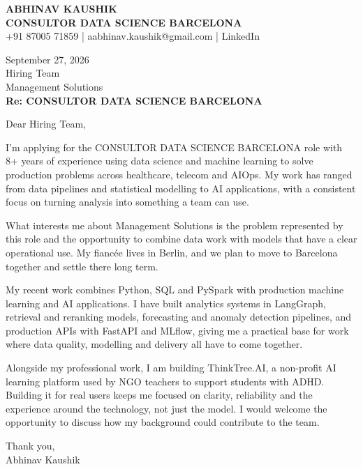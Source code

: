 \documentclass[10pt,a4paper]{article}
\begin{document}
\begin{center}
{\Large\bfseries ABHINAV KAUSHIK}\\[2pt]
{\bfseries CONSULTOR DATA SCIENCE BARCELONA}\\[2pt]
+91 87005 71859 \quad | \quad aabhinav.kaushik@gmail.com \quad | \quad LinkedIn
\end{center}
\vspace{8pt}
September 27, 2026\\[6pt]
Hiring Team\\
Management Solutions\\[4pt]
\textbf{Re: CONSULTOR DATA SCIENCE BARCELONA}

Dear Hiring Team,

I’m applying for the CONSULTOR DATA SCIENCE BARCELONA role with 8+ years of experience using data science and machine learning to solve production problems across healthcare, telecom and AIOps. My work has ranged from data pipelines and statistical modelling to AI applications, with a consistent focus on turning analysis into something a team can use.

What interests me about Management Solutions is the problem represented by this role and the opportunity to combine data work with models that have a clear operational use. My fiancée lives in Berlin, and we plan to move to Barcelona together and settle there long term.

My recent work combines Python, SQL and PySpark with production machine learning and AI applications. I have built analytics systems in LangGraph, retrieval and reranking models, forecasting and anomaly detection pipelines, and production APIs with FastAPI and MLflow, giving me a practical base for work where data quality, modelling and delivery all have to come together.

Alongside my professional work, I am building ThinkTree.AI, a non-profit AI learning platform used by NGO teachers to support students with ADHD. Building it for real users keeps me focused on clarity, reliability and the experience around the technology, not just the model. I would welcome the opportunity to discuss how my background could contribute to the team.

Thank you,\\
Abhinav Kaushik
\end{document}

